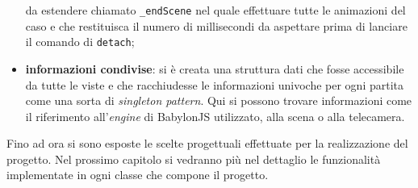 \begin{itemize}
    da estendere chiamato \texttt{\_endScene} nel quale effettuare tutte le animazioni del caso e che restituisca il numero di millisecondi da aspettare prima di lanciare il comando di 
    \texttt{detach};
    \item \textbf{informazioni condivise}: si è creata una struttura dati che fosse accessibile da tutte le viste e che racchiudesse le informazioni univoche per ogni partita come una sorta
    di \textit{singleton pattern}. Qui si possono trovare informazioni come il riferimento all'\textit{engine} di BabylonJS utilizzato, alla scena o alla telecamera.
\end{itemize}
Fino ad ora si sono esposte le scelte progettuali effettuate per la realizzazione del progetto. Nel prossimo capitolo si vedranno più nel dettaglio le funzionalità implementate in ogni
classe che compone il progetto.